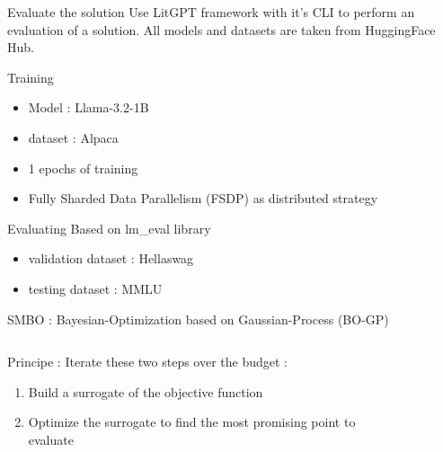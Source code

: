 \begin{frame}{Evaluate the solution}
    Use LitGPT framework with it's CLI to perform an evaluation of a solution. All models and datasets are taken from HuggingFace Hub.
    \begin{block}{Training}
        \begin{itemize}
            \item Model : Llama-3.2-1B
            \item dataset : Alpaca
            \item 1 epochs of training
            \item Fully Sharded Data Parallelism (FSDP) as distributed strategy
        \end{itemize}
    \end{block}

    \begin{block}{Evaluating}
        Based on lm\_eval library
        \begin{itemize}
            \item validation dataset : Hellaswag
            \item testing dataset : MMLU
        \end{itemize}
    \end{block}

    
\end{frame}

\begin{frame}{SMBO : Bayesian-Optimization based on Gaussian-Process (BO-GP)}
    \begin{columns}
        \begin{column}{0.4\textwidth}

            \begin{block}{Principe :}
                Iterate these two steps over the budget : 
                \begin{enumerate}
                    \item Build a surrogate of the objective function
                    \item Optimize the surrogate to find the most promising point to evaluate
                \end{enumerate}
                
                
            \end{block}
            
        \end{column}        
        \begin{column}{0.5\textwidth}
            \begin{figure}
                \centering
                
            \end{figure}
        \end{column}
    \end{columns}
    
\end{frame}

